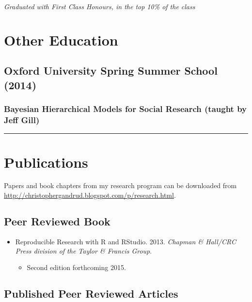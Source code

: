 \documentclass[a4paper]{article}
\begin{document}
{{{\emph{Graduated with First Class Honours, in the top 10\% of the class}}

\section*{Other Education}

\subsection*{Oxford University Spring Summer School (2014)}

\subsubsection*{Bayesian Hierarchical Models for Social Research (taught by Jeff Gill)}

\vspace{0.25cm}
\medskip\hrule height 1pt
\vspace{0.5cm}


\section*{Publications}

\noindent Papers and book chapters from my research program can be downloaded from {\url{http://christophergandrud.blogspot.com/p/research.html}}.

\subsection*{Peer Reviewed Book}

\begin{itemize}
    \item Reproducible Research with R and RStudio. 2013. {\emph{Chapman \& Hall/CRC Press division of the Taylor \& Francis Group}}.

        \begin{itemize}
            \item Second edition forthcoming 2015.
        \end{itemize}

\end{itemize}

\subsection*{Published Peer Reviewed Articles}

}}
\end{document}
